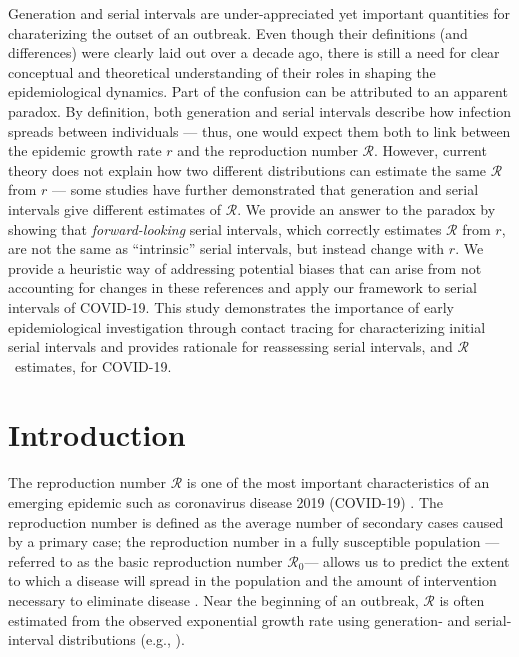 \documentclass[12pt]{article}
\newcommand{\Rx}[1]{\ensuremath{{\mathcal R}_{#1}}\xspace}
\newcommand{\Ro}{\Rx{0}}
\newcommand{\RR}{\ensuremath{{\mathcal R}}\xspace}
\begin{document}
Generation and serial intervals are under-appreciated yet important quantities for charaterizing the outset of an outbreak.
Even though their definitions (and differences) were clearly laid out over a decade ago, there is still a need for clear conceptual and theoretical understanding of their roles in shaping the epidemiological dynamics.
Part of the confusion can be attributed to an apparent paradox.
By definition, both generation and serial intervals describe how infection spreads between individuals --- thus, one would expect them both to link between the epidemic growth rate $r$ and the reproduction number \RR.
However, current theory does not explain how two different distributions can estimate the same \RR from $r$ --- some studies have further demonstrated that generation and serial intervals give different estimates of \RR.
We provide an answer to the paradox by showing that \emph{forward-looking} serial intervals, which correctly estimates \RR from $r$, are not the same as ``intrinsic'' serial intervals, but instead change with $r$. 
We provide a heuristic way of addressing potential biases that can arise from not accounting for changes in these references and apply our framework to serial intervals of COVID-19.
This study demonstrates the importance of early epidemiological investigation through contact tracing for characterizing initial serial intervals and provides rationale for reassessing serial intervals, and \RR\ estimates, for COVID-19.

\pagebreak

\section{Introduction}

The reproduction number \RR is one of the most important characteristics of an emerging epidemic such as coronavirus disease 2019 (COVID-19) \citep{majumder2020early}.
The reproduction number is defined as the average number of secondary cases caused by a primary case;
the reproduction number in a fully susceptible population --- referred to as the basic reproduction number \Ro --- allows us to predict the extent to which a disease will spread in the population and the amount of intervention necessary to eliminate disease \citep{anderson1991infectious}.
Near the beginning of an outbreak, \RR is often estimated from the observed exponential growth rate using generation- and serial-interval distributions (e.g., \cite{du2020serial, jung2020real, li2020early, zhao2020preliminary}).
\end{document}
